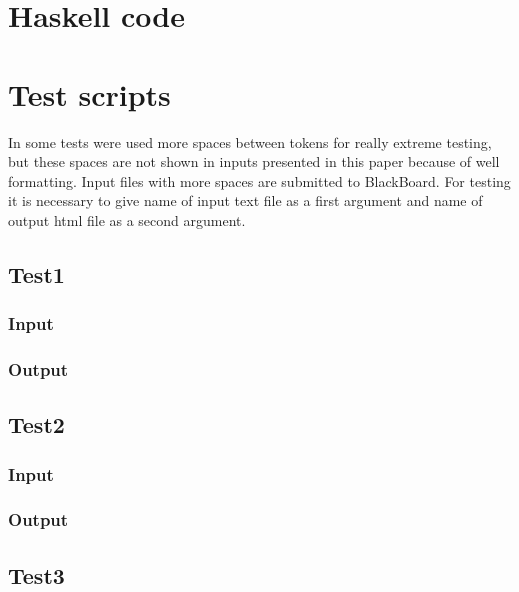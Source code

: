 \documentclass[5pt]{article}
\begin{document}
\maketitle

\section{Haskell code}


\section{Test scripts}
In some tests were used more spaces between tokens for really extreme testing,
but these spaces are not shown in inputs presented in this paper because of
well formatting. Input files with more spaces are submitted to BlackBoard. For
testing it is necessary to give name of input text file as a first argument and
name of output html file as a second argument.
\subsection{Test1}
\subsubsection{Input}


\subsubsection{Output}


\subsection{Test2}
\subsubsection{Input}


\subsubsection{Output}


\newpage
\subsection{Test3}
\end{document}
